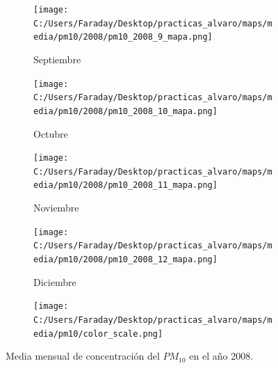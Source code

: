 \documentclass[12pt]{beamer}
\begin{document}
\begin{frame}[squeeze]
\begin{figure}[H]
\begin{subfigure}[H]{0.20\textwidth}
\texttt{[image: C:/Users/Faraday/Desktop/practicas\_alvaro/maps/media/pm10/2008/pm10\_2008\_9\_mapa.png]}
\captionsetup{labelformat=empty}
\caption{\scriptsize Septiembre}
\label{fig:map-pm10-2008-9}
\end{subfigure}
%
\begin{subfigure}[H]{0.20\textwidth}
\texttt{[image: C:/Users/Faraday/Desktop/practicas\_alvaro/maps/media/pm10/2008/pm10\_2008\_10\_mapa.png]}
\captionsetup{labelformat=empty}
\caption{\scriptsize Octubre}
\label{fig:map-pm10-2008-10}
\end{subfigure}
%
\begin{subfigure}[H]{0.20\textwidth}
\texttt{[image: C:/Users/Faraday/Desktop/practicas\_alvaro/maps/media/pm10/2008/pm10\_2008\_11\_mapa.png]}
\captionsetup{labelformat=empty}
\caption{\scriptsize Noviembre}
\label{fig:map-pm10-2008-11}
\end{subfigure}
%
\begin{subfigure}[H]{0.20\textwidth}
\texttt{[image: C:/Users/Faraday/Desktop/practicas\_alvaro/maps/media/pm10/2008/pm10\_2008\_12\_mapa.png]}
\captionsetup{labelformat=empty}
\caption{\scriptsize Diciembre}
\label{fig:map-pm10-2008-12}
\end{subfigure}

\begin{subfigure}[H]{0.45\textwidth}
\texttt{[image: C:/Users/Faraday/Desktop/practicas\_alvaro/maps/media/pm10/color\_scale.png]}
\captionsetup{labelformat=empty}
\caption{}
\end{subfigure}

\vspace*{-7mm}
\caption{\scriptsize Media mensual de concentración del $PM_{10}$ en el año 2008.}
\label{fig:map-pm10-2008}
\end{figure}
\end{frame}
\end{document}
